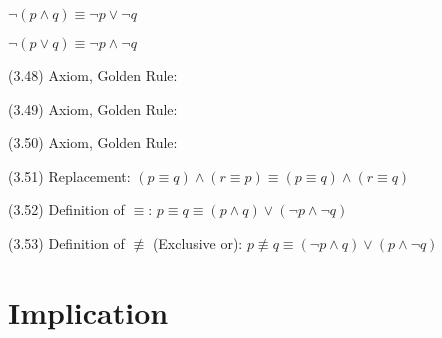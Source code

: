 \documentclass[a4paper,10pt]{article}
\newenvironment{theoremlist}{
\begin{description}
  \setlength{\itemsep}{1.5pt}
  \setlength{\parskip}{0pt}
  \setlength{\parsep}{0pt}
}{\end{description}}
\begin{document}
\begin{theoremlist}
  \begin{theoremlist}
  \item %
  \item										$ \lnot(p \land q) \equiv \lnot p \lor \lnot q $
  \item 									$ \lnot(p \lor q) \equiv \lnot p \land \lnot q $
  \end{theoremlist}      
\item[(3.48) Axiom, Golden Rule:]						$	$
\item[(3.49) Axiom, Golden Rule:]						$	$
\item[(3.50) Axiom, Golden Rule:]						$	$
\item[(3.51) Replacement:]							$ (p \equiv q ) \land (r \equiv p) \equiv (p \equiv q) \land (r \equiv q) $
\item[(3.52) Definition of $\equiv$:]						$ p \equiv q \equiv (p \land q) \lor (\lnot p \land \lnot q) $
\item[(3.53) Definition of $\nequiv$ (Exclusive or):]				$ p \nequiv q \equiv (\lnot p \land q) \lor (p \land \lnot q) $
\end{theoremlist}


\section{Implication}
\end{document}
